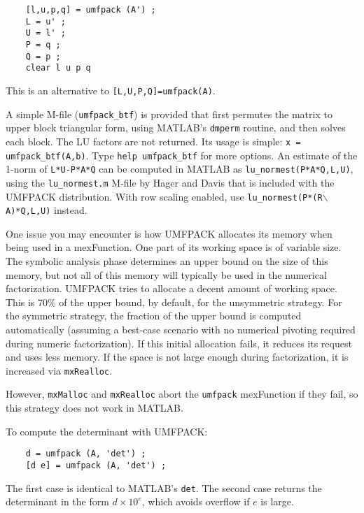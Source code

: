 \documentclass[11pt]{article}
\begin{document}
\begin{verbatim}
    [l,u,p,q] = umfpack (A') ;
    L = u' ;
    U = l' ;
    P = q ;
    Q = p ;
    clear l u p q
\end{verbatim}

This is an alternative to {\tt [L,U,P,Q]=umfpack(A)}.

A simple M-file ({\tt umfpack\_btf}) is provided that first permutes the matrix
to upper block triangular form, using MATLAB's {\tt dmperm} routine, and then
solves each block.  The LU factors are not returned.  Its usage is simple:
{\tt x = umfpack\_btf(A,b)}.  Type {\tt help umfpack\_btf} for more options.
An estimate of the 1-norm of {\tt L*U-P*A*Q} can be computed in MATLAB
as {\tt lu\_normest(P*A*Q,L,U)}, using the {\tt lu\_normest.m} M-file
by Hager and Davis \cite{DavisHager99} that is included with the
UMFPACK distribution.  With row scaling enabled, use
{\tt lu\_normest(P*(R}$\backslash${\tt A)*Q,L,U)} instead.

One issue you may encounter is how UMFPACK allocates its memory when being used
in a mexFunction.  One part of its working space is of variable size.   The
symbolic analysis phase determines an upper bound on the size of this memory,
but not all of this memory will typically be used in the numerical
factorization.  UMFPACK tries to allocate a decent amount of working space.
This is 70\% of the upper bound, by default, for the unsymmetric strategy.
For the symmetric strategy, the fraction of the upper bound is computed
automatically (assuming a best-case scenario with no numerical pivoting
required during numeric factorization).
If this initial allocation fails, it reduces its request
and uses less memory.   If the space is not large enough during factorization,
it is increased via {\tt mxRealloc}.

However, {\tt mxMalloc} and {\tt mxRealloc} abort the {\tt umfpack} mexFunction
if they fail, so this strategy does not work in MATLAB.

To compute the determinant with UMFPACK:

\begin{verbatim}
    d = umfpack (A, 'det') ;
    [d e] = umfpack (A, 'det') ;
\end{verbatim}

The first case is identical to MATLAB's {\tt det}.
The second case returns the determinant in the form
$d \times 10^e$, which avoids overflow if $e$ is large.

\end{document}
